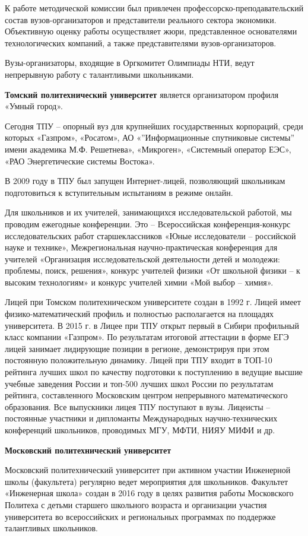 К работе методической комиссии был привлечен профессорско-преподавательский состав вузов-организаторов и представители реального сектора экономики. Объективную оценку работы осуществляет жюри, представленное основателями технологических компаний, а также представителями вузов-организаторов.  

Вузы-организаторы, входящие в Оргкомитет Олимпиады НТИ, ведут непрерывную работу с талантливыми школьниками.

\textbf{Томский политехнический университет} является организатором профиля «Умный город».

Сегодня ТПУ – опорный вуз для крупнейших государственных корпораций, среди которых «Газпром», «Росатом», АО «”Информационные спутниковые системы” имени академика М.Ф. Решетнева», «Микроген», «Системный оператор ЕЭС», «РАО Энергетические системы Востока».

В 2009 году в ТПУ был запущен Интернет-лицей, позволяющий школьникам подготовиться к вступительным испытаниям в режиме онлайн.

Для школьников и их учителей, занимающихся исследовательской работой, мы проводим ежегодные конференции. Это – Всероссийская конференция-конкурс исследовательских работ старшеклассников «Юные исследователи – российской науке и технике», Межрегиональная научно-практическая конференция для учителей «Организация исследовательской деятельности детей и молодежи: проблемы, поиск, решения»,  конкурс учителей физики «От школьной физики – к высоким технологиям» и конкурс учителей химии «Мой выбор – химия».

Лицей при Томском политехническом университете создан в 1992 г. Лицей имеет физико-математический профиль и полностью располагается на площадях университета. В  2015 г.  в Лицее при ТПУ открыт первый в Сибири профильный класс компании «Газпром». По результатам итоговой аттестации в форме ЕГЭ  лицей занимает лидирующие позиции в регионе, демонстрируя при этом постоянную положительную динамику. Лицей при ТПУ входит  в ТОП-10  рейтинга лучших школ по качеству подготовки к поступлению в ведущие высшие учебные заведения России и топ-500 лучших школ России по результатам рейтинга, составленного Московским центром непрерывного математического образования. Все выпускники лицея ТПУ поступают в вузы. Лицеисты – постоянные участники и дипломанты Международных научно-технических конференций школьников, проводимых МГУ, МФТИ, НИЯУ МИФИ и др.

\textbf{Московский политехнический университет}

Московский политехнический университет при активном участии Инженерной школы (факультета) регулярно ведет мероприятия для школьников. Факультет «Инженерная школа» создан в 2016 году в целях развития работы Московского Политеха с детьми старшего школьного возраста и организации участия университета во всероссийских и региональных программах по поддержке талантливых школьников.

